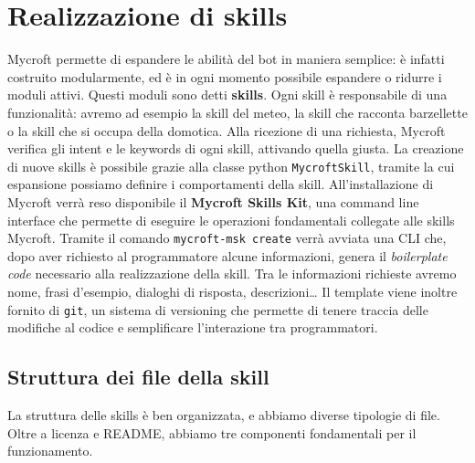 \chapter{Realizzazione di skills}
\label{chap:skills}
Mycroft permette di espandere le abilità del bot in maniera semplice: è infatti costruito modularmente, ed è in ogni momento possibile espandere o ridurre i moduli attivi.
Questi moduli sono detti \textbf{skills}. Ogni skill è responsabile di una funzionalità: avremo ad esempio la skill del meteo, la skill che racconta barzellette o la skill che si occupa della domotica. Alla ricezione di una richiesta, Mycroft verifica gli intent e le keywords di ogni skill, attivando quella giusta.
La creazione di nuove skills è possibile grazie alla classe python \texttt{MycroftSkill}, tramite la cui espansione possiamo definire i comportamenti della skill. All'installazione di Mycroft verrà reso disponibile il \textbf{Mycroft Skills Kit}, una command line interface che permette di eseguire le operazioni fondamentali collegate alle skills Mycroft. Tramite il comando \texttt{mycroft-msk create} verrà avviata una CLI che, dopo aver richiesto al programmatore alcune informazioni, genera il \textit{boilerplate code} necessario alla realizzazione della skill. Tra le informazioni richieste avremo nome, frasi d'esempio, dialoghi di risposta, descrizioni\dots
Il template viene inoltre fornito di \texttt{git}, un sistema di versioning che permette di tenere traccia delle modifiche al codice e semplificare l'interazione tra programmatori.
\section{Struttura dei file della skill}
La struttura delle skills è ben organizzata, e abbiamo diverse tipologie di file. Oltre a licenza e README, abbiamo tre componenti fondamentali per il funzionamento.

